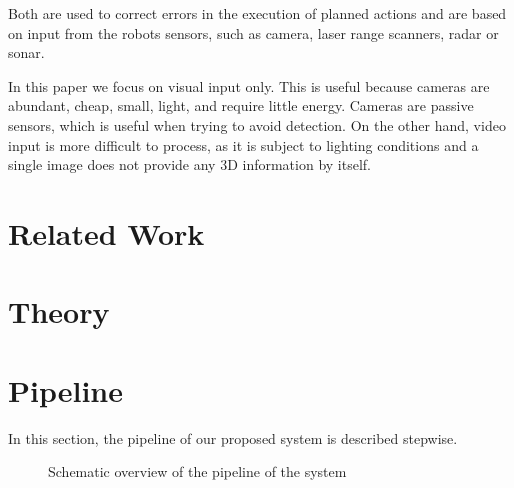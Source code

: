\documentclass[a4paper]{article}
\begin{document}
Both are used to correct errors in the execution of planned actions and are
based on input from the robots sensors, such as camera, laser range scanners,
radar or sonar.

In this paper we focus on visual input only. This is useful because cameras are
abundant, cheap, small, light, and require little energy. Cameras are passive
sensors, which is useful when trying to avoid detection.
On the other hand, video input is more difficult to process, as it is subject
to lighting conditions and a single image does not provide any 3D information
by itself.

\section{Related Work}

\section{Theory}

\section{Pipeline}
In this section, the pipeline of our proposed system is described stepwise.

\begin{figure}[!hb]
	\centerline{
	}
	\caption{Schematic overview of the pipeline of the system}
	\label{fig:system}
\end{figure}
\end{document}
